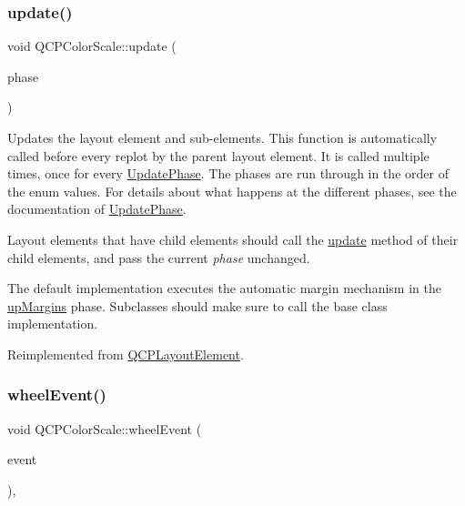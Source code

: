 \subsubsection{\texorpdfstring{update()}{update()}}
{\footnotesize\ttfamily void Q\+C\+P\+Color\+Scale\+::update (\begin{DoxyParamCaption}\item[{\hyperlink{class_q_c_p_layout_element_a0d83360e05735735aaf6d7983c56374d}{Update\+Phase}}]{phase }\end{DoxyParamCaption})\hspace{0.3cm}{\ttfamily [virtual]}}

Updates the layout element and sub-\/elements. This function is automatically called before every replot by the parent layout element. It is called multiple times, once for every \hyperlink{class_q_c_p_layout_element_a0d83360e05735735aaf6d7983c56374d}{Update\+Phase}. The phases are run through in the order of the enum values. For details about what happens at the different phases, see the documentation of \hyperlink{class_q_c_p_layout_element_a0d83360e05735735aaf6d7983c56374d}{Update\+Phase}.

Layout elements that have child elements should call the \hyperlink{class_q_c_p_color_scale_a259dcb6d3053a2cc3c197e9b1191ddbe}{update} method of their child elements, and pass the current {\itshape phase} unchanged.

The default implementation executes the automatic margin mechanism in the \hyperlink{class_q_c_p_layout_element_a0d83360e05735735aaf6d7983c56374da288cb59a92280e47261a341f2813e676}{up\+Margins} phase. Subclasses should make sure to call the base class implementation. 

Reimplemented from \hyperlink{class_q_c_p_layout_element_a929c2ec62e0e0e1d8418eaa802e2af9b}{Q\+C\+P\+Layout\+Element}.

\mbox{\label{class_q_c_p_color_scale_a63cf19be184f6670c9495ad3a9a1baeb}} 
\subsubsection{\texorpdfstring{wheel\+Event()}{wheelEvent()}}
{\footnotesize\ttfamily void Q\+C\+P\+Color\+Scale\+::wheel\+Event (\begin{DoxyParamCaption}\item[{Q\+Wheel\+Event $\ast$}]{event }\end{DoxyParamCaption})\hspace{0.3cm}{\ttfamily [protected]}, {\ttfamily [virtual]}}

